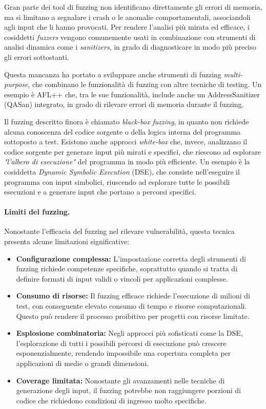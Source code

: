 Gran parte dei tool di fuzzing non identificano direttamente gli errori di
memoria, ma si limitano a segnalare i crash o le anomalie comportamentali,
associandoli agli input che li hanno provocati. Per rendere l'analisi più mirata
ed efficace, i cosiddetti \textit{fuzzers} vengono comunemente usati in combinazione
con strumenti di analisi dinamica come i \textit{sanitizers}, in grado di diagnosticare
in modo più preciso gli errori sottostanti.

Questa mancanza ha portato a sviluppare anche strumenti di fuzzing \textit{multi-purpose},
che combinano le funzionalità di fuzzing con altre tecniche di testing. Un
esempio è AFL++\cite{afl_plus_plus} che, tra le sue funzionalità, include anche un
AddressSanitizer (QASan\cite{qasan}) integrato, in grado di rilevare errori di memoria
durante il fuzzing.

Il fuzzing descritto finora è chiamato \textit{black-box fuzzing}, in quanto non
richiede alcuna conoscenza del codice sorgente o della logica interna del programma
sottoposto a test. Esistono anche approcci \textit{white-box} che, invece, analizzano
il codice sorgente per generare input più mirati e specifici, che riescono ad
esplorare \textit{"l'albero di esecuzione"} del programma in modo più efficiente.
Un esempio è la cosiddetta \textit{Dynamic Symbolic Execution} (DSE), che
consiste nell'eseguire il programma con input simbolici, riuscendo ad esplorare tutte
le possibili esecuzioni e a generare input che portano a percorsi specifici.

\paragraph{Limiti del fuzzing.}
Nonostante l'efficacia del fuzzing nel rilevare vulnerabilità, questa tecnica presenta
alcune limitazioni significative:

\begin{itemize}
  \item \textbf{Configurazione complessa:} L'impostazione corretta degli
    strumenti di fuzzing richiede competenze specifiche, soprattutto quando si tratta
    di definire formati di input validi o vincoli per applicazioni complesse.

  \item \textbf{Consumo di risorse:} Il fuzzing efficace richiede l'esecuzione
    di milioni di test, con conseguente elevato consumo di tempo e risorse computazionali.
    Questo può rendere il processo proibitivo per progetti con risorse limitate.

  \item \textbf{Esplosione combinatoria:} Negli approcci più sofisticati come la
    DSE, l'esplorazione di tutti i possibili percorsi di esecuzione può crescere
    esponenzialmente, rendendo impossibile una copertura completa per
    applicazioni di medie o grandi dimensioni.

  \item \textbf{Coverage limitata:} Nonostante gli avanzamenti nelle tecniche di
    generazione degli input, il fuzzing potrebbe non raggiungere porzioni di codice
    che richiedono condizioni di ingresso molto specifiche.
\end{itemize}

